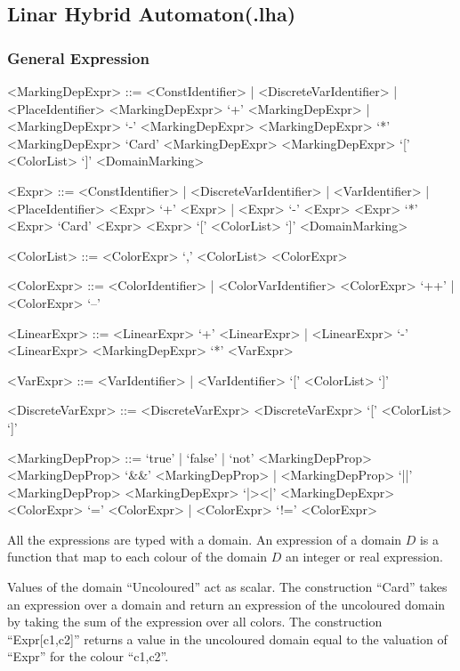 \documentclass{article}
\begin{document}
\subsection{Linar Hybrid Automaton(.lha)}

\subsubsection{General Expression}

\begin{scriptsize}
\begin{grammar}
  <MarkingDepExpr> ::= <ConstIdentifier> | <DiscreteVarIdentifier> | <PlaceIdentifier>
  \alt  <MarkingDepExpr> `+'  <MarkingDepExpr> | <MarkingDepExpr> `-'  <MarkingDepExpr>
  \alt  <MarkingDepExpr> `*'  <MarkingDepExpr>
  \alt `Card' <MarkingDepExpr>
  \alt <MarkingDepExpr> `[' <ColorList> `]'
  \alt <DomainMarking>

 <Expr> ::= <ConstIdentifier> | <DiscreteVarIdentifier>  | <VarIdentifier> | <PlaceIdentifier>
  \alt  <Expr> `+'  <Expr> | <Expr> `-'  <Expr>
  \alt  <Expr> `*'  <Expr>
  \alt `Card' <Expr>
  \alt <Expr> `[' <ColorList> `]'
  \alt <DomainMarking>

  <ColorList> ::= <ColorExpr> `,' <ColorList>
  \alt <ColorExpr>

  <ColorExpr> ::= <ColorIdentifier> | <ColorVarIdentifier>
  \alt <ColorExpr> `++' | <ColorExpr> `--'

  <LinearExpr> ::= <LinearExpr> `+'  <LinearExpr> | <LinearExpr> `-'  <LinearExpr>
  \alt <MarkingDepExpr> `*' <VarExpr>

  <VarExpr> ::= <VarIdentifier> | <VarIdentifier> `[' <ColorList> `]'

  <DiscreteVarExpr> ::= <DiscreteVarExpr> \alt <DiscreteVarExpr> `[' <ColorList> `]'

<MarkingDepProp> ::= `true' | `false' | `not' <MarkingDepProp>
  \alt <MarkingDepProp> `\&\&' <MarkingDepProp> |  <MarkingDepProp> `||' <MarkingDepProp>
  \alt <MarkingDepExpr> `|\!\!>\!<\!\!|' <MarkingDepExpr>  
  \alt <ColorExpr> `=' <ColorExpr> | <ColorExpr> `!=' <ColorExpr>

\end{grammar}
\end{scriptsize}

All the expressions are typed with a domain. An expression of a domain
$D$ is a function that map to each colour of the domain $D$ an integer
or real expression. 

Values of the domain ``Uncoloured'' act as scalar.  The construction
``Card'' takes an expression over a domain and return an expression of
the uncoloured domain by taking the sum of the expression over all
colors. The construction ``Expr[c1,c2]'' returns a value in the
uncoloured domain equal to the valuation of ``Expr'' for the colour
``c1,c2''.
\end{document}
